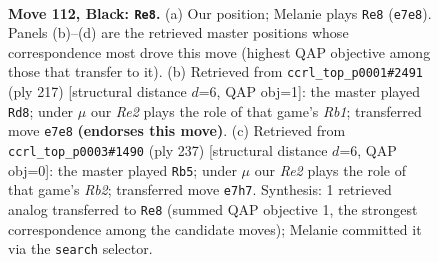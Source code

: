 \documentclass[11pt]{article}
\begin{document}
\clearpage

\begin{figure}[p]\centering
\begin{subfigure}{0.46\textwidth}\centering
\resizebox{\linewidth}{!}{%
\newchessgame
\chessboard[
  setfen={8/4r3/5K2/8/6k1/8/8/8 b - - 9 112},
  showmover=false,
  pgfstyle=straightmove, color=movearrow, markmove={e7-e8}
]}
\caption{}
\end{subfigure}\hfill
\begin{subfigure}{0.46\textwidth}\centering
\resizebox{\linewidth}{!}{%
\newchessgame
\chessboard[
  setfen={1r6/4k3/8/8/K7/8/3N4/8 b - - 13 109},
  showmover=false,
  pgfstyle=straightmove, color=movearrow, markmove={b8-d8}
]}
\caption{}
\end{subfigure}
\\[4pt]
\begin{subfigure}{0.46\textwidth}\centering
\resizebox{\linewidth}{!}{%
\newchessgame
\chessboard[
  setfen={8/1r6/3K4/8/k7/8/4Q3/8 b - - 14 119},
  showmover=false,
  pgfstyle=straightmove, color=movearrow, markmove={b7-b5}
]}
\caption{}
\end{subfigure}\hfill

\caption{\textbf{Move 112, Black: \texttt{Re8}.} (a) Our position; Melanie plays \texttt{Re8} (\texttt{e7e8}). Panels (b)--(d) are the retrieved master positions whose correspondence most drove this move (highest QAP objective among those that transfer to it). (b) Retrieved from \texttt{ccrl\_top\_p0001\#2491} (ply 217) [structural distance $d$=6, QAP obj=1]: the master played \texttt{Rd8}; under $\mu$ our \emph{Re2} plays the role of that game's \emph{Rb1}; transferred move \texttt{e7e8} \textbf{(endorses this move)}. (c) Retrieved from \texttt{ccrl\_top\_p0003\#1490} (ply 237) [structural distance $d$=6, QAP obj=0]: the master played \texttt{Rb5}; under $\mu$ our \emph{Re2} plays the role of that game's \emph{Rb2}; transferred move \texttt{e7h7}. Synthesis: 1 retrieved analog transferred to \texttt{Re8} (summed QAP objective 1, the strongest correspondence among the candidate moves); Melanie committed it via the \texttt{search} selector.}
\label{fig:thought-m223}
\end{figure}

\clearpage
\end{document}
